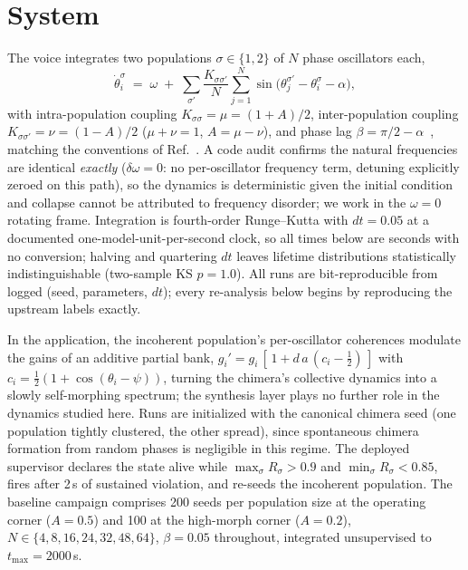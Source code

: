 \documentclass[aip,preprint,amsmath,amssymb]{revtex4-2}
\begin{document}
\section{System}\label{sec:system}

The voice integrates two populations $\sigma \in \{1, 2\}$ of $N$ phase oscillators
each,
\begin{equation}
\dot\theta_i^\sigma \;=\; \omega \;+\; \sum_{\sigma'} \frac{K_{\sigma\sigma'}}{N}
\sum_{j=1}^{N} \sin\!\big(\theta_j^{\sigma'} - \theta_i^{\sigma} - \alpha\big),
\label{eq:model}
\end{equation}
with intra-population coupling $K_{\sigma\sigma} = \mu = (1+A)/2$, inter-population
coupling $K_{\sigma\sigma'} = \nu = (1-A)/2$ ($\mu + \nu = 1$, $A = \mu - \nu$), and
phase lag $\beta = \pi/2 - \alpha$~\cite{kuramoto1984,sk1986}, matching the
conventions of Ref.~\cite{abrams2008}. A code audit confirms the natural frequencies are identical
\emph{exactly} ($\delta\omega = 0$: no per-oscillator frequency term, detuning
explicitly zeroed on this path), so the dynamics is deterministic given the initial
condition and collapse cannot be attributed to frequency disorder; we work in the
$\omega = 0$ rotating frame. Integration is fourth-order Runge--Kutta with
$dt = 0.05$ at a documented one-model-unit-per-second clock, so all times below are
seconds with no conversion; halving and quartering $dt$ leaves lifetime
distributions statistically indistinguishable (two-sample KS $p = 1.0$). All runs are
bit-reproducible from logged (seed, parameters, $dt$); every re-analysis below begins
by reproducing the upstream labels exactly.

In the application, the incoherent population's per-oscillator coherences modulate
the gains of an additive partial bank, $g_i' = g_i\,[\,1 + d\,a\,(c_i - \tfrac12)\,]$
with $c_i = \tfrac12(1 + \cos(\theta_i - \psi))$, turning the chimera's collective
dynamics into a slowly self-morphing spectrum; the synthesis layer plays no further
role in the dynamics studied here. Runs are initialized with the canonical chimera
seed (one population tightly clustered, the other spread), since spontaneous chimera
formation from random phases is negligible in this regime. The deployed supervisor
declares the state alive while $\max_\sigma R_\sigma > 0.9$ and
$\min_\sigma R_\sigma < 0.85$, fires after 2\,s of sustained violation, and re-seeds
the incoherent population. The baseline campaign comprises 200 seeds per population
size at the operating corner ($A = 0.5$) and 100 at the high-morph corner
($A = 0.2$), $N \in \{4, 8, 16, 24, 32, 48, 64\}$, $\beta = 0.05$ throughout,
integrated unsupervised to $t_{\max} = 2000$\,s.
\end{document}
